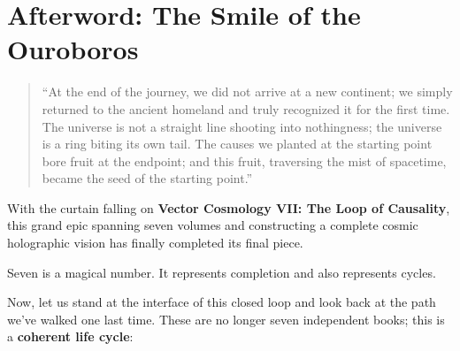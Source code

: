 \section{Afterword: The Smile of the Ouroboros}

\begin{quote}
``At the end of the journey, we did not arrive at a new continent; we simply returned to the ancient homeland and truly recognized it for the first time. The universe is not a straight line shooting into nothingness; the universe is a ring biting its own tail. The causes we planted at the starting point bore fruit at the endpoint; and this fruit, traversing the mist of spacetime, became the seed of the starting point.''
\end{quote}

With the curtain falling on \textbf{Vector Cosmology VII: The Loop of Causality}, this grand epic spanning seven volumes and constructing a complete cosmic holographic vision has finally completed its final piece.

Seven is a magical number. It represents completion and also represents cycles.

Now, let us stand at the interface of this closed loop and look back at the path we've walked one last time. These are no longer seven independent books; this is a \textbf{coherent life cycle}:

